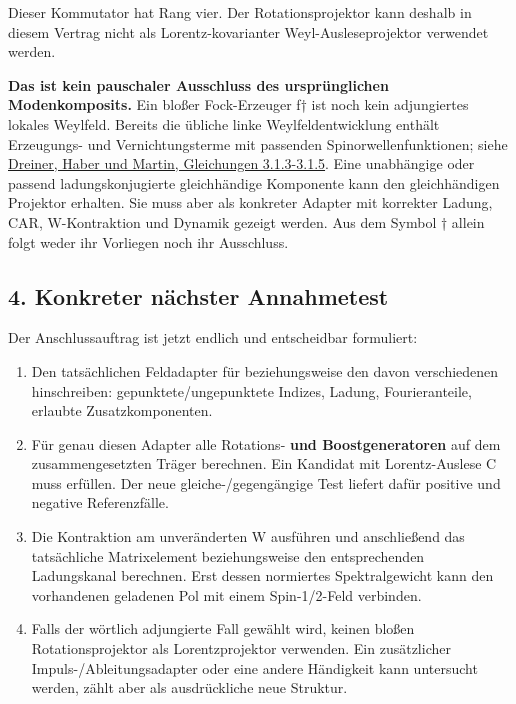 Dieser Kommutator hat Rang vier. Der Rotationsprojektor kann deshalb in
diesem Vertrag nicht als Lorentz-kovarianter Weyl-Ausleseprojektor
verwendet werden.

\textbf{Das ist kein pauschaler Ausschluss des ursprünglichen
Modenkomposits.} Ein bloßer Fock-Erzeuger f† ist noch kein adjungiertes
lokales Weylfeld. Bereits die übliche linke Weylfeldentwicklung enthält
Erzeugungs- und Vernichtungsterme mit passenden Spinorwellenfunktionen;
siehe \href{https://arxiv.org/pdf/0812.1594\#page=24}{Dreiner, Haber und
Martin, Gleichungen 3.1.3-3.1.5}. Eine unabhängige oder passend
ladungskonjugierte gleichhändige Komponente kann den gleichhändigen
Projektor erhalten. Sie muss aber als konkreter Adapter mit korrekter
Ladung, CAR, W-Kontraktion und Dynamik gezeigt werden. Aus dem Symbol †
allein folgt weder ihr Vorliegen noch ihr Ausschluss.

\subsection{4. Konkreter nächster
Annahmetest}\label{konkreter-nuxe4chster-annahmetest}

Der Anschlussauftrag ist jetzt endlich und entscheidbar formuliert:

\begin{enumerate}
\def\labelenumi{\arabic{enumi}.}
\tightlist
\item
  Den tatsächlichen Feldadapter für 
  beziehungsweise den davon verschiedenen 
  hinschreiben: gepunktete/ungepunktete Indizes, Ladung, Fourieranteile,
  erlaubte Zusatzkomponenten.
\item
  Für genau diesen Adapter alle Rotations- \textbf{und Boostgeneratoren}
  auf dem zusammengesetzten Träger berechnen. Ein Kandidat mit
  Lorentz-Auslese C muss  erfüllen.
  Der neue gleiche-/gegengängige Test liefert dafür positive und
  negative Referenzfälle.
\item
  Die Kontraktion am unveränderten W ausführen und anschließend das
  tatsächliche Matrixelement  beziehungsweise den
  entsprechenden Ladungskanal berechnen. Erst dessen normiertes
  Spektralgewicht kann den vorhandenen geladenen Pol mit einem
  Spin-1/2-Feld verbinden.
\item
  Falls der wörtlich adjungierte Fall gewählt wird, keinen bloßen
  Rotationsprojektor als Lorentzprojektor verwenden. Ein zusätzlicher
  Impuls-/Ableitungsadapter oder eine andere Händigkeit kann untersucht
  werden, zählt aber als ausdrückliche neue Struktur.
\end{enumerate}

